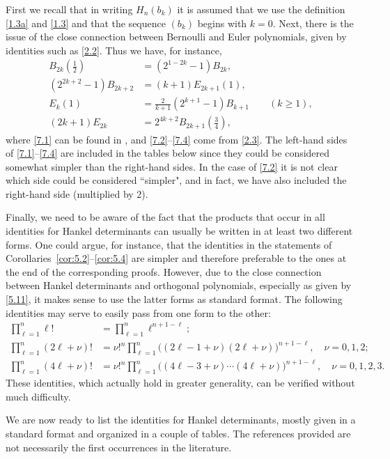 \documentclass{amsart}
\theoremstyle{plain}
\numberwithin{equation}{section}
\begin{document}
First we recall that in writing $H_n(b_k)$ it is assumed that we use the
definition \eqref{1.3a} and \eqref{1.3} and that the sequence $(b_k)$ begins
with $k=0$. Next, there is the issue of the close connection between Bernoulli
and Euler polynomials, given by identities such as \eqref{2.2}. Thus we have,
for instance,
\begin{align}
B_{2k}(\tfrac{1}{2}) &= \left(2^{1-2k}-1\right)B_{2k},\label{7.1}\\
\left(2^{2k+2}-1\right)B_{2k+2} &= (k+1)E_{2k+1}(1),\label{7.2}\\
E_k(1)&=\frac{2}{k+1}\left(2^{k+1}-1\right)B_{k+1}\qquad(k\geq 1),\label{7.3}\\
(2k+1)E_{2k} &= 2^{4k+2}B_{2k+1}(\tfrac{3}{4}),\label{7.4}
\end{align}
where \eqref{7.1} can be found in \cite[Eq.~24.4.27]{DLMF}, and 
\eqref{7.2}--\eqref{7.4} come from \eqref{2.3}. The left-hand sides of 
\eqref{7.1}--\eqref{7.4} are included in the tables below since they could be
considered somewhat simpler than the right-hand sides. In the case of 
\eqref{7.2} it is not clear which side could be considered ``simpler", and in
fact, we have also included the right-hand side (multiplied by 2).

Finally, we need to be aware of the fact that the products that occur in 
all identities for Hankel determinants can usually be written in at least two
different forms. One could argue, for instance, that the identities in the
statements of Corollaries~\ref{cor:5.2}--\ref{cor:5.4} are simpler and therefore
preferable to the ones at the end of the corresponding proofs. However, due
to the close connection between Hankel determinants and orthogonal polynomials,
especially as given by \eqref{5.11}, it makes sense to use the latter forms
as standard format. The following identities may serve to easily pass from one
form to the other:
\begin{align}
\prod_{\ell=1}^n\ell! &= \prod_{\ell=1}^n\ell^{n+1-\ell};\label{7.5}\\
\prod_{\ell=1}^n(2\ell+\nu)!  &= \nu!^n\prod_{\ell=1}^n
\big((2\ell-1+\nu)(2\ell+\nu)\big)^{n+1-\ell},\quad\nu=0,1,2;\label{7.6}\\
\prod_{\ell=1}^n(4\ell+\nu)!  &= \nu!^n\prod_{\ell=1}^n
\big((4\ell-3+\nu)\cdots(4\ell+\nu)\big)^{n+1-\ell},\quad\nu=0,1,2,3.\label{7.7}
\end{align}
These identities, which actually hold in greater generality, can be verified without much difficulty.

We are now ready to list the identities for Hankel determinants, mostly given 
in a standard format and organized in a couple of tables. The references 
provided are not necessarily the first occurrences in the literature. 
\end{document}

